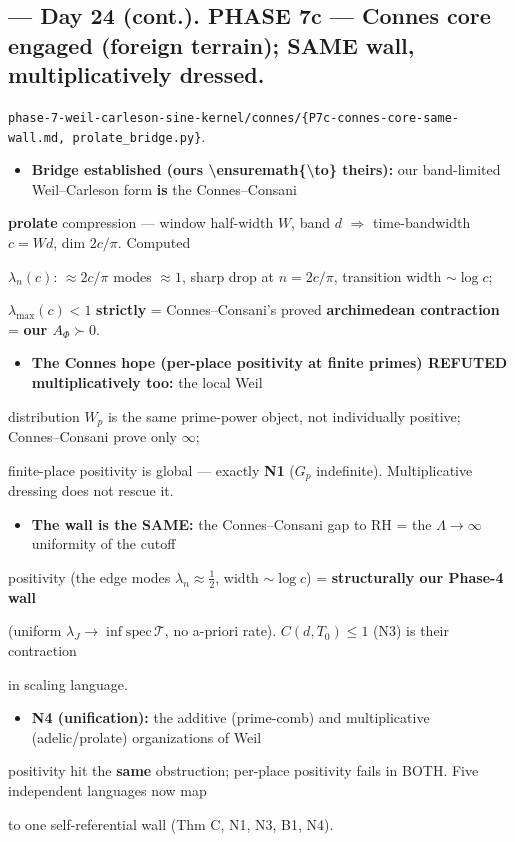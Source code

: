 \documentclass[10pt]{article}
\begin{document}
\subsection*{ --- Day 24 (cont.). PHASE 7c --- Connes core engaged (foreign terrain); SAME wall, multiplicatively dressed.}
\texttt{phase-7-weil-carleson-sine-kernel/connes/\{P7c-connes-core-same-wall.md, prolate\_bridge.py\}}.\par
\begin{itemize}
\item \textbf{Bridge established (ours \textbackslash{}ensuremath\{\textbackslash{}to\} theirs):} our band-limited Weil--Carleson form \textbf{is} the Connes--Consani
\end{itemize}
  \textbf{prolate} compression --- window half-width $W$, band $d$ \ensuremath{\Rightarrow} time-bandwidth $c=Wd$, dim $2c/\pi$. Computed\par
  $\lambda_n(c)$: $\approx2c/\pi$ modes $\approx1$, sharp drop at $n=2c/\pi$, transition width $\sim\log c$;\par
  $\lambda_{\max}(c)<1$ \textbf{strictly} = Connes--Consani's proved \textbf{archimedean contraction} = \textbf{our $A_\Phi\succ0$}.\par
\begin{itemize}
\item \textbf{The Connes hope (per-place positivity at finite primes) REFUTED multiplicatively too:} the local Weil
\end{itemize}
  distribution $W_p$ is the same prime-power object, not individually positive; Connes--Consani prove only $\infty$;\par
  finite-place positivity is global --- exactly \textbf{N1} ($G_p$ indefinite). Multiplicative dressing does not rescue it.\par
\begin{itemize}
\item \textbf{The wall is the SAME:} the Connes--Consani gap to RH = the $\Lambda\to\infty$ uniformity of the cutoff
\end{itemize}
  positivity (the edge modes $\lambda_n\approx\tfrac12$, width $\sim\log c$) = \textbf{structurally our Phase-4 wall}\par
  (uniform $\lambda_J\to\inf\mathrm{spec}\,\mathcal T$, no a-priori rate). $C(d,T_0)\le1$ (N3) is their contraction\par
  in scaling language.\par
\begin{itemize}
\item \textbf{N4 (unification):} the additive (prime-comb) and multiplicative (adelic/prolate) organizations of Weil
\end{itemize}
  positivity hit the \textbf{same} obstruction; per-place positivity fails in BOTH. Five independent languages now map\par
  to one self-referential wall (Thm C, N1, N3, B1, N4).\par
\end{document}
